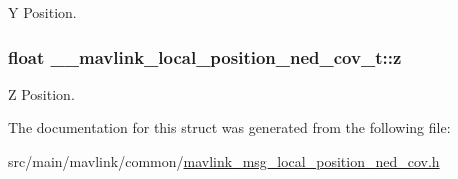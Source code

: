 Y Position. 

\hypertarget{struct____mavlink__local__position__ned__cov__t_a166ffd74c38f3062f8d053eda226e1a4}{
\subsubsection[{z}]{\setlength{\rightskip}{0pt plus 5cm}float \+\_\+\+\_\+mavlink\+\_\+local\+\_\+position\+\_\+ned\+\_\+cov\+\_\+t\+::z}}\label{struct____mavlink__local__position__ned__cov__t_a166ffd74c38f3062f8d053eda226e1a4}


Z Position. 



The documentation for this struct was generated from the following file\+:\begin{DoxyCompactItemize}
\item 
src/main/mavlink/common/\hyperlink{mavlink__msg__local__position__ned__cov_8h}{mavlink\+\_\+msg\+\_\+local\+\_\+position\+\_\+ned\+\_\+cov.\+h}\end{DoxyCompactItemize}
